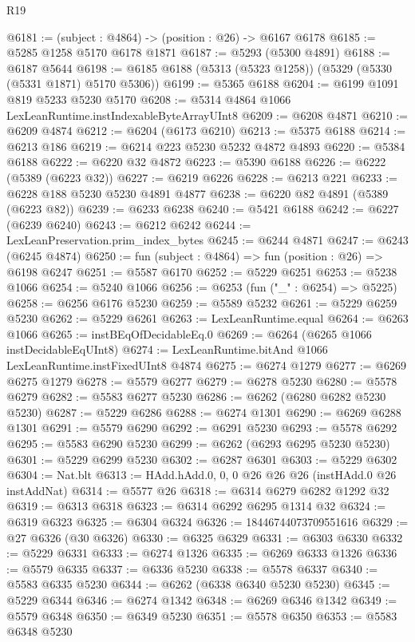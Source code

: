 \begin{lexlean}{R19}
\begin{coremodule}
@6181 := (subject : @4864) -> (position : @26) -> @6167 @6178
@6185 := @5285 @1258 @5170 @6178 @1871
@6187 := @5293 (@5300 @4891)
@6188 := @6187 @5644
@6198 := @6185 @6188 (@5313 (@5323 @1258)) (@5329 (@5330 (@5331 @1871) @5170 @5306))
@6199 := @5365 @6188
@6204 := @6199 @1091 @819 @5233 @5230 @5170
@6208 := @5314 @4864 @1066 LexLeanRuntime.instIndexableByteArrayUInt8
@6209 := @6208 @4871
@6210 := @6209 @4874
@6212 := @6204 (@6173 @6210)
@6213 := @5375 @6188
@6214 := @6213 @186
@6219 := @6214 @223 @5230 @5232 @4872 @4893
@6220 := @5384 @6188
@6222 := @6220 @32 @4872
@6223 := @5390 @6188
@6226 := @6222 (@5389 (@6223 @32))
@6227 := @6219 @6226
@6228 := @6213 @221
@6233 := @6228 @188 @5230 @5230 @4891 @4877
@6238 := @6220 @82 @4891 (@5389 (@6223 @82))
@6239 := @6233 @6238
@6240 := @5421 @6188
@6242 := @6227 (@6239 @6240)
@6243 := @6212 @6242
@6244 := LexLeanPreservation.prim_index_bytes
@6245 := @6244 @4871
@6247 := @6243 (@6245 @4874)
@6250 := fun (subject : @4864) => fun (position : @26) => @6198 @6247
@6251 := @5587 @6170
@6252 := @5229 @6251
@6253 := @5238 @1066
@6254 := @5240 @1066
@6256 := @6253 (fun ("_" : @6254) => @5225)
@6258 := @6256 @6176 @5230
@6259 := @5589 @5232
@6261 := @5229 @6259 @5230
@6262 := @5229 @6261
@6263 := LexLeanRuntime.equal
@6264 := @6263 @1066
@6265 := instBEqOfDecidableEq.{0}
@6269 := @6264 (@6265 @1066 instDecidableEqUInt8)
@6274 := LexLeanRuntime.bitAnd @1066 LexLeanRuntime.instFixedUInt8 @4874
@6275 := @6274 @1279
@6277 := @6269 @6275 @1279
@6278 := @5579 @6277
@6279 := @6278 @5230
@6280 := @5578 @6279
@6282 := @5583 @6277 @5230
@6286 := @6262 (@6280 @6282 @5230 @5230)
@6287 := @5229 @6286
@6288 := @6274 @1301
@6290 := @6269 @6288 @1301
@6291 := @5579 @6290
@6292 := @6291 @5230
@6293 := @5578 @6292
@6295 := @5583 @6290 @5230
@6299 := @6262 (@6293 @6295 @5230 @5230)
@6301 := @5229 @6299 @5230
@6302 := @6287 @6301
@6303 := @5229 @6302
@6304 := Nat.blt
@6313 := HAdd.hAdd.{0, 0, 0} @26 @26 @26 (instHAdd.{0} @26 instAddNat)
@6314 := @5577 @26
@6318 := @6314 @6279 @6282 @1292 @32
@6319 := @6313 @6318
@6323 := @6314 @6292 @6295 @1314 @32
@6324 := @6319 @6323
@6325 := @6304 @6324
@6326 := 18446744073709551616
@6329 := @27 @6326 (@30 @6326)
@6330 := @6325 @6329
@6331 := @6303 @6330
@6332 := @5229 @6331
@6333 := @6274 @1326
@6335 := @6269 @6333 @1326
@6336 := @5579 @6335
@6337 := @6336 @5230
@6338 := @5578 @6337
@6340 := @5583 @6335 @5230
@6344 := @6262 (@6338 @6340 @5230 @5230)
@6345 := @5229 @6344
@6346 := @6274 @1342
@6348 := @6269 @6346 @1342
@6349 := @5579 @6348
@6350 := @6349 @5230
@6351 := @5578 @6350
@6353 := @5583 @6348 @5230

\end{coremodule}
\end{lexlean}
